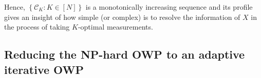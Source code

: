 Hence, $\left\{ \mathcal{C}_{K}: K \in [N] \right\}$ is a monotonically increasing sequence and its profile gives an insight of how simple (or complex) is to resolve the information of $X$ in the process of taking $K$-optimal measurements. 
































































\subsection{Reducing the NP-hard OWP to an adaptive iterative OWP}





